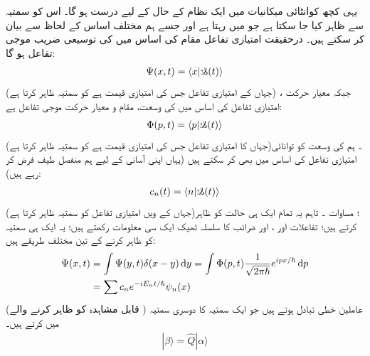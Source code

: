  یہی کچھ کوانٹائی میکانیات میں ایک نظام کے حال کے لیے درست ہو گا۔ اس کو سمتیہ  سے ظاہر کیا جا سکتا ہے جو  میں رہتا ہے اور جسے ہم مختلف اساس کے لحاظ سے بیان کر سکتے ہیں۔ درحقیقت امتیازی تفاعل مقام کی اساس میں  کی توسیعی  ضریب  موجی تفاعل  ہو گا:
\begin{align}
\Psi(x,t) = \langle x | \s(t) \rangle 
\end{align}
(جہاں  کے امتیازی تفاعل جس کی امتیازی قیمت  ہے کو سمتیہ  ظاہر کرتا ہے) ، جبکہ معیار حرکت امتیازی تفاعل کی اساس میں  کی وسعت، مقام و معیار حرکت موجی تفاعل  ہے:
\begin{align}
\Phi(p,t) = \langle p | \s (t) \rangle
\end{align}
(جہاں  کا امتیازی تفاعل جس کی امتیازی قیمت  ہے کو سمتیہ  ظاہر کرتا ہے)۔ ہم  کی وسعت کو توانائی امتیازی تفاعل کی اساس میں بھی کر سکتے ہیں (یہاں اپنی آسانی کے لیے ہم منفصل طیف فرض کر رہے ہیں):
\begin{align}
c_{n} (t) = \langle n | \s (t) \rangle
\end{align}
(جہاں  کے  ویں امتیازی تفاعل کو سمتیہ  ظاہر کرتا ہے)؛ مساوات ۔ تاہم یہ تمام ایک ہی حالت کو ظاہر کرتے ہیں؛ تفاعلات  اور ، اور ضرائب کا سلسلہ ٹھیک ایک سی معلومات رکھتے ہیں؛ یہ ایک ہی سمتیہ کو ظاہر کرنے کے تین مختلف طریقے ہیں:
\begin{align}
\Psi (x,t) &= \int \Psi(y,t) \delta (x-y) \dif y = \int \Phi (p,t) \frac{1}{\sqrt{2\pi\hslash}} e^{ipx/\hslash} \dif p \nonumber \\ 
&= \sum c_{n} e^{-iE_{n}t/\hslash} \psi_{n}(x)
\end{align}
(قابل مشاہدہ کو ظاہر کرنے والے ) عاملین خطی تبادل  ہوتے ہیں جو ایک سمتیہ کا  دوسری سمتیہ میں کرتے ہیں۔
\begin{align}\label{مساوات_قواعد_بیٹا_سمتیہ}
| \beta \rangle = \hat{Q}|\alpha \rangle
\end{align}
